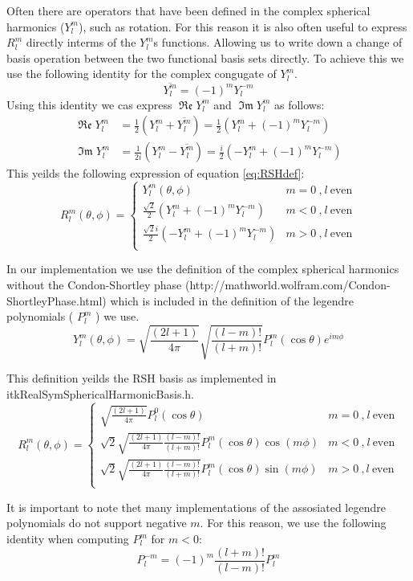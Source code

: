 \documentclass[a4paper,10pt]{article}
\renewcommand\Re{\operatorname{\mathfrak{Re}}}
\renewcommand\Im{\operatorname{\mathfrak{Im}}}
\begin{document}
Often there are operators that have been defined in the complex spherical harmonics ($Y_l^m$), such as rotation. For this reason it is also often useful to  express $R_l^m$ directly interms of the $Y_l^m$s functions. Allowing us to write down a change of basis operation between the two functional basis sets directly. To achieve this we use the following identity for the complex congugate of $Y_l^m$.
\begin{equation*}
\label{eq:SHcomplexConjugate}
\overline{Y_l^m} = (-1)^m Y_l^{-m}
\end{equation*}
Using this identity we cas express $\Re{Y_l^m}$ and $\Im{Y_l^m}$ as follows:
\begin{align*}
\Re{Y_l^m} &= \frac{1}{2} \left( Y_l^m + \overline{Y_l^m} \right) = \frac{1}{2} \left( Y_l^m + (-1)^m Y_l^{-m} \right) \\
\Im{Y_l^m} &= \frac{1}{2 i} \left( Y_l^m - \overline{Y_l^m} \right) = \frac{i}{2} \left( - Y_l^m + (-1)^{m} Y_l^{-m} \right)
\end{align*}
This yeilds the following expression of equation \ref{eq:RSHdef}:
\begin{equation}
R_l^m(\theta,\phi) = \begin{cases}
         Y_l^m(\theta,\phi)               & m = 0 \: \text{,} \: l \: \text{even}\\
	\frac{\sqrt{2}}{2} \left( Y_l^m + (-1)^m Y_l^{-m} \right)  & m < 0 \: \text{,} \: l \: \text{even}\\
        \frac{\sqrt{2}i}{2} \left( - Y_l^m + (-1)^{m} Y_l^{-m} \right)  & m > 0 \: \text{,} \: l \: \text{even}\\        
\end{cases}
\end{equation}

In our implementation we use the definition of the complex spherical harmonics without the Condon-Shortley phase (http://mathworld.wolfram.com/Condon-ShortleyPhase.html) which is included in the definition of the legendre polynomials ( $P_l^m$ ) we use. 
\begin{equation*}
Y_l^m(\theta,\phi) = \sqrt{\frac{(2 l +1)}{4 \pi}} \sqrt{\frac{(l-m)!}{(l+m)!}} P_l^m (\cos \theta) e^{i m \phi}  
\end{equation*}

This definition yeilds the RSH basis as implemented in itkRealSymSphericalHarmonicBasis.h.
\begin{equation}
R_l^m(\theta,\phi) = \begin{cases}
        \sqrt{\frac{(2 l +1)}{4 \pi}} P_l^0 (\cos \theta)             & m = 0 \: \text{,} \: l \: \text{even}\\
	\sqrt{2} \sqrt{\frac{(2 l +1)}{4 \pi} \frac{(l-m)!}{(l+m)!}} P_l^m (\cos \theta) \cos(m \phi)    & m < 0 \: \text{,} \: l \: \text{even}\\
        \sqrt{2} \sqrt{\frac{(2 l +1)}{4 \pi} \frac{(l-m)!}{(l+m)!}} P_l^m (\cos \theta) \sin(m \phi)    & m > 0 \: \text{,} \, l \: \text{even}\\        
\end{cases}
\end{equation}

It is important to note thet many implementations of the assosiated legendre polynomials do not support negative $m$. For this reason, we use the following identity when computing $P_l^m$ for $m < 0$:
\begin{equation*}
P_l^{-m} = (-1)^m \frac{(l+m)!}{(l-m)!} P_l^{m}
\end{equation*}
\end{document}

